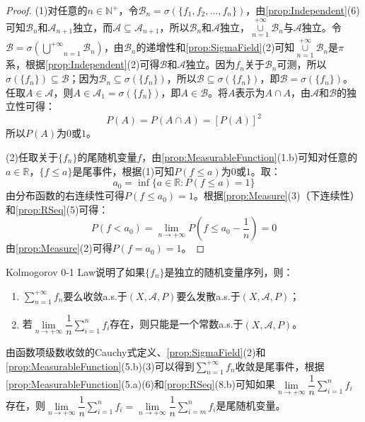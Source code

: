 \begin{proof}
	(1)对任意的$n\in\mathbb{N}^+$，令$\mathscr{B}_n=\sigma(\{f_1,f_2,\dots,f_n\})$，由\cref{prop:Independent}(6)可知$\mathscr{B}_n$和$\mathscr{A}_{n+1}$独立，而$\mathscr{A}\subseteq\mathscr{A}_{n+1}$，所以$\mathscr{B}_n$和$\mathscr{A}$独立，$\underset{n=1}{\overset{+\infty}{\cup}}\mathscr{B}_n$与$\mathscr{A}$独立。令$\mathscr{B}=\sigma\left(\underset{n=1}{\overset{+\infty}{\bigcup}}\mathscr{B}_n\right)$，由$\mathscr{B}_n$的递增性和\cref{prop:SigmaField}(2)可知$\underset{n=1}{\overset{+\infty}{\cup}}\mathscr{B}_n$是$\pi$系，根据\cref{prop:Independent}(2)可得$\mathscr{B}$和$\mathscr{A}$独立。因为$f_n$关于$\mathscr{B}_n$可测，所以$\sigma(\{f_n\})\subseteq\mathscr{B}$；因为$\mathscr{B}_n\subseteq\sigma(\{f_n\})$，所以$\mathscr{B}\subseteq\sigma(\{f_n\})$，即$\mathscr{B}=\sigma(\{f_n\})$。任取$A\in\mathscr{A}$，则$A\in\mathscr{A}_1=\sigma(\{f_n\})$，即$A\in\mathscr{B}$。将$A$表示为$A\cap A$，由$\mathscr{A}$和$\mathscr{B}$的独立性可得：
	\begin{equation*}
		P(A)=P(A\cap A)=[P(A)]^2
	\end{equation*}
	所以$P(A)$为$0$或$1$。\par
	(2)任取关于$\{f_n\}$的尾随机变量$f$，由\cref{prop:MeasurableFunction}(1.b)可知对任意的$a\in\mathbb{R}$，$\{f\leqslant a\}$是尾事件，根据(1)可知$P(f\leqslant a)$为$0$或$1$。取：
	\begin{equation*}
		a_0=\inf\{a\in\mathbb{R}:P(f\leqslant a)=1\}
	\end{equation*}
	由分布函数的右连续性可得$P(f\leqslant a_0)=1$。根据\cref{prop:Measure}(3)（下连续性）和\cref{prop:RSeq}(5)可得：
	\begin{equation*}
		P(f<a_0)=\lim_{n\to+\infty}P\left(f\leqslant a_0-\frac{1}{n}\right)=0
	\end{equation*}
	由\cref{prop:Measure}(2)可得$P(f=a_0)=1$。
\end{proof}
\begin{note}
	Kolmogorov 0-1 Law说明了如果$\{f_n\}$是独立的随机变量序列，则：
	\begin{enumerate}
		\item $\sum\limits_{n=1}^{+\infty}f_n$要么收敛a.s.于$(X,\mathscr{A},P)$要么发散a.s.于$(X,\mathscr{A},P)$；
		\item 若$\lim\limits_{n\to+\infty}\dfrac{1}{n}\sum\limits_{i=1}^{n}f_i$存在，则只能是一个常数a.s.于$(X,\mathscr{A},P)$。
	\end{enumerate}
	由函数项级数收敛的Cauchy式定义、\cref{prop:SigmaField}(2)和\cref{prop:MeasurableFunction}(5.b)(3)可以得到$\sum\limits_{n=1}^{+\infty}f_n$收敛是尾事件，根据\cref{prop:MeasurableFunction}(5.a)(6)和\cref{prop:RSeq}(8.b)可知如果$\lim\limits_{n\to+\infty}\dfrac{1}{n}\sum\limits_{i=1}^{n}f_i$存在，则$\lim\limits_{n\to+\infty}\dfrac{1}{n}\sum\limits_{i=1}^{n}f_i=\lim\limits_{n\to+\infty}\dfrac{1}{n}\sum\limits_{i=m}^{n}f_i$是尾随机变量。
\end{note}
